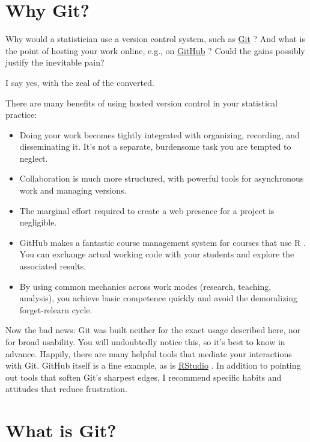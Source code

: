 \documentclass[12pt]{article}
\providecommand{\tightlist}{%
  \setlength{\itemsep}{0pt}\setlength{\parskip}{0pt}}
\begin{document}
\newpage
{} %

\section{Why Git?}\label{why-git}

Why would a statistician use a version control system, such as
\href{https://git-scm.com}{Git} \citep{git}? And what is the point of
hosting your work online, e.g., on \href{https://github.com}{GitHub}
\citep{github}? Could the gains possibly justify the inevitable pain?

I say yes, with the zeal of the converted.

There are many benefits of using hosted version control in your
statistical practice:

\begin{itemize}
\tightlist
\item
  Doing your work becomes tightly integrated with organizing, recording,
  and disseminating it. It's not a separate, burdensome task you are
  tempted to neglect.
\item
  Collaboration is much more structured, with powerful tools for
  asynchronous work and managing versions.
\item
  The marginal effort required to create a web presence for a project is
  negligible.
\item
  GitHub makes a fantastic course management system for courses that use
  R \citep{R}. You can exchange actual working code with your students
  and explore the associated results.
\item
  By using common mechanics across work modes (research, teaching,
  analysis), you achieve basic competence quickly and avoid the
  demoralizing forget-relearn cycle.
\end{itemize}

Now the bad news: Git was built neither for the exact usage described
here, nor for broad usability. You will undoubtedly notice this, so it's
best to know in advance. Happily, there are many helpful tools that
mediate your interactions with Git. GitHub itself is a fine example, as
is \href{https://www.rstudio.com/products/rstudio/}{RStudio}
\citep{rstudio}. In addition to pointing out tools that soften Git's
sharpest edges, I recommend specific habits and attitudes that reduce
frustration.

\section{What is Git?}\label{what-is-git}
\end{document}
